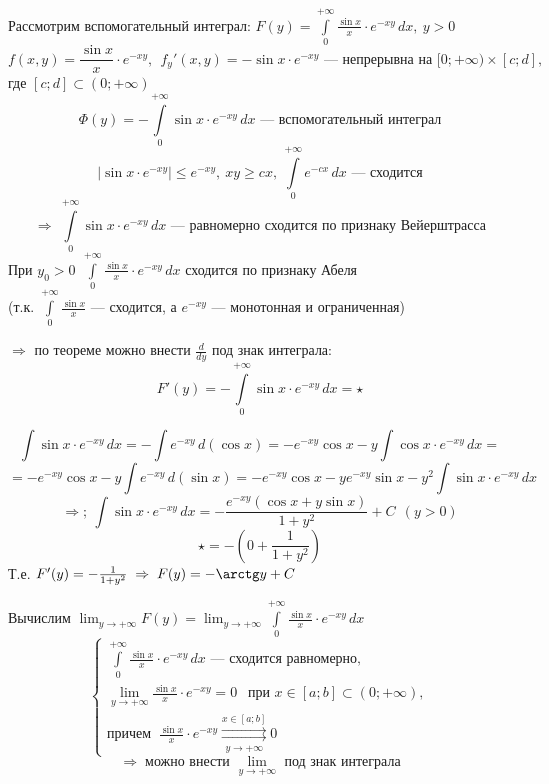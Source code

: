 \begin{properties}
\begin{enumerate}
\begin{example}
            Рассмотрим вспомогательный интеграл: $F(y) = \int\limits_0^{+\infty} \frac{\sin x}x \cdot e^{-xy}\,dx, \ y > 0$
            \[ f(x, y) = \frac{\sin x}x \cdot e^{-xy}, \ \ f_y'(x, y) = -\sin x \cdot e^{-xy} 
            \text{ --- непрерывна на } [0; +\infty) \times [c; d], \]
            где $[c; d] \subset (0; +\infty)$
            \[ \Phi(y) = -\int\limits_0^{+\infty} \sin x \cdot e^{-xy}\,dx \text{ --- вспомогательный интеграл} \]
            \[ \left| \sin x \cdot e^{-xy} \right| \le e^{-xy}, \ xy \ge cx, \ \int\limits_0^{+\infty} e^{-cx}\,dx \text{ --- сходится} \]
            \[ \Rightarrow\; \int\limits_0^{+\infty} \sin x \cdot e^{-xy}\,dx \text{ --- равномерно сходится по признаку Вейерштрасса} \]
            При $y_0 > 0 \ \ \int\limits_0^{+\infty} \frac{\sin x}x \cdot e^{-xy}\,dx$ сходится по признаку Абеля \\
            (т.к. $\int\limits_0^{+\infty} \frac{\sin x}x$ --- сходится, а $e^{-xy}$ --- монотонная и ограниченная)
            
            $\Rightarrow$ по теореме можно внести $\frac{d}{dy}$ под знак интеграла:
            \[ F'(y) = -\int\limits_0^{+\infty} \sin x \cdot e^{-xy}\,dx = \star \]
            
            \[ \int \sin x \cdot e^{-xy}\,dx = -\int e^{-xy}\,d(\cos x) = -e^{-xy} \cos x - y \int \cos x \cdot e^{-xy}\,dx = \]
            \[ = -e^{-xy} \cos x - y \int e^{-xy}\,d(\sin x) = -e^{-xy} \cos x - y e^{-xy} \sin x - y^2 \int \sin x \cdot e^{-xy}\,dx \]
            \[ \Rightarrow;\ \int \sin x \cdot e^{-xy}\,dx = -\frac{e^{-xy} (\cos x + y \sin x)}{1 + y^2} + C \ \ (y > 0) \]
            \[ \star = -\left( 0 + \frac1{1 + y^2} \right) \]
            Т.е. $F'(y) = -\frac1{1 + y^2} \;\Rightarrow\; F(y) = -\arctg y + C$
            
            Вычислим $\lim_{y \to +\infty} F(y) = \lim_{y \to +\infty} \int\limits_0^{+\infty} \frac{\sin x}x \cdot e^{-xy}\,dx$
            \[ \left\{\begin{array}{l} 
            \int\limits_0^{+\infty} \frac{\sin x}x \cdot e^{-xy}\,dx \text{ --- сходится равномерно}, \\
            \lim_{y \to +\infty} \frac{\sin x}x \cdot e^{-xy} = 0 \ \ \text{ при } x \in [a; b] \subset (0; +\infty), \\
            \text{причем } \ \frac{\sin x}x \cdot e^{-xy} \overset{x \in [a; b]}{\underset{y \to +\infty}{\rightrightarrows}} 0
            \end{array}\right. \]
            \[ \Rightarrow\; \text{можно внести } \lim_{y \to +\infty} \text{ под знак интеграла} \]
            

\end{example}
\end{enumerate}
\end{properties}
